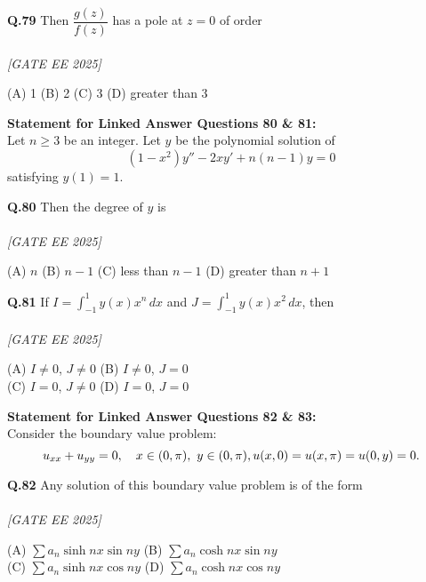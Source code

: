 \documentclass[11pt]{article}
\begin{document}
\begin{flushleft}
\textbf{Q.79} Then $\dfrac{g(z)}{f(z)}$ has a pole at $z = 0$ of order \\
\\[1ex] \textit{[GATE EE 2025]}

(A) 1 \hspace{2em} (B) 2 \hspace{2em} (C) 3 \hspace{2em} (D) greater than 3
\end{flushleft}

\bigskip

\noindent\textbf{Statement for Linked Answer Questions 80 \& 81:} \\
Let $n \geq 3$ be an integer. Let $y$ be the polynomial solution of \\
\[
(1 - x^2)y'' - 2xy' + n(n-1)y = 0
\]
satisfying $y(1) = 1$.

\begin{flushleft}
\textbf{Q.80} Then the degree of $y$ is \\
\\[1ex] \textit{[GATE EE 2025]}


(A) $n$ \hspace{2em} (B) $n - 1$ \hspace{2em} (C) less than $n - 1$ \hspace{2em} (D) greater than $n + 1$
\end{flushleft}

\begin{flushleft}
\textbf{Q.81} If $I = \int_{-1}^{1} y(x) x^n \, dx$ and $J = \int_{-1}^{1} y(x) x^2 \, dx$, then \\
\\[1ex] \textit{[GATE EE 2025]}

(A) $I \neq 0$, $J \neq 0$ \hspace{2em}
(B) $I \neq 0$, $J = 0$ \\
(C) $I = 0$, $J \neq 0$ \hspace{2em}
(D) $I = 0$, $J = 0$
\end{flushleft}

\noindent\textbf{Statement for Linked Answer Questions 82 \& 83:} \\
Consider the boundary value problem:
\[
u_{xx} + u_{yy} = 0,\quad x \in (0,\pi),\ y \in (0,\pi), \\
u(x,0) = u(x,\pi) = u(0,y) = 0.
\]

\begin{flushleft}
\textbf{Q.82} Any solution of this boundary value problem is of the form \\
\\[1ex] \textit{[GATE EE 2025]}


(A) $\sum a_n \sinh nx \sin ny$ \hspace{2em}
(B) $\sum a_n \cosh nx \sin ny$ \\
(C) $\sum a_n \sinh nx \cos ny$ \hspace{2em}
(D) $\sum a_n \cosh nx \cos ny$
\end{flushleft}
\end{document}
